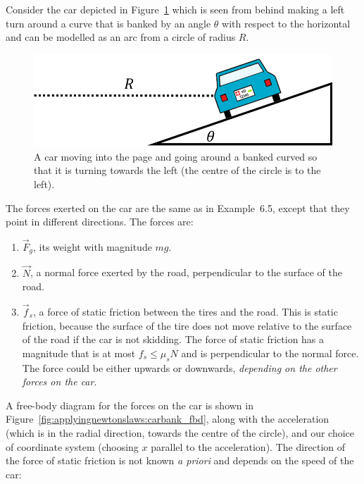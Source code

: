 Consider the car depicted in Figure~\ref{fig:applyingnewtonslaws:carbank} which is seen from behind making a left turn around a curve that is banked by an angle $\theta$ with respect to the horizontal and can be modelled as an arc from a circle of radius $R$.

\begin{figure}[!htbp]
\centering
\includegraphics[width=0.7\linewidth]{files/carbank-1f87f47046a3d7845d4293aeb68f4429.png}
\caption[]{A car moving into the page and going around a banked curved so that it is turning towards the left (the centre of the circle is to the left).}
\label{fig:applyingnewtonslaws:carbank}
\end{figure}

The forces exerted on the car are the same as in Example~6.5, except that they point in different directions. The forces are:

\begin{enumerate}
\item $\vec F_g$, its weight with magnitude $mg$.
\item $\vec N$, a normal force exerted by the road, perpendicular to the surface of the road.
\item $\vec f_s$, a force of static friction between the tires and the road. This is static friction, because the surface of the tire does not move relative to the surface of the road if the car is not skidding. The force of static friction has a magnitude that is at most $f_s\leq\mu_sN$ and is perpendicular to the normal force. The force could be either upwards or downwards, \textit{depending on the other forces on the car}.
\end{enumerate}

A free-body diagram for the forces on the car is shown in Figure~\ref{fig:applyingnewtonslaws:carbank_fbd}, along with the acceleration (which is in the radial direction, towards the centre of the circle), and our choice of coordinate system (choosing $x$ parallel to the acceleration). The direction of the force of static friction is not known \textit{a priori} and depends on the speed of the car:

